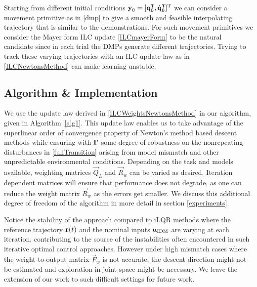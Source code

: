 Starting from different initial conditions $\boldsymbol{\mathrm{y}}_0 = [\boldsymbol{\mathrm{q}}^{\intercal}_0,\dot{\boldsymbol{\mathrm{q}}}^{\intercal}_0]^{\mathrm{T}}$ we can consider a movement primitive as in \eqref{dmp} to give a smooth and feasible interpolating trajectory that is similar to the demonstrations.
For such movement primitives we consider the Mayer form ILC update \eqref{ILCmayerForm} to be the natural candidate since in each trial the DMPs generate different trajectories. Trying to track these varying trajectories with an ILC update law as in \eqref{ILCNewtonsMethod} can make learning unstable.




\subsection{Algorithm \& Implementation}\label{algorithm}

We use the update law derived in \eqref{ILCWeightsNewtonsMethod} in our algorithm, given in Algorithm~\ref{alg1}. This update law enables us to take advantage of the superlinear order of convergence property of Newton's method based descent methods while ensuring with $\boldsymbol{\mathrm{\Gamma}}$ some degree of robustness on the nonrepeating disturbances in \eqref{fullTransition} arising from model mismatch and other unpredictable environmental conditions. Depending on the task and models available, weighting matrices $\vec{Q}_{L}$ and $\vec{R}_{w}$ can be varied as desired. Iteration dependent matrices will ensure that performance does not degrade, as one can reduce the weight matrix $\vec{R}_{w}$ as the errors get smaller. We discuss this additional degree of freedom of the algorithm in more detail in section \ref{experiments}.


Notice the stability of the approach compared to iLQR methods where the reference trajectory $\boldsymbol{\mathrm{r}}(t)$ and the nominal inputs $\boldsymbol{\mathrm{u}}_{\mathrm{IDM}}$ are varying at each iteration, contributing to the source of the instabilities often encountered in such iterative optimal control approaches. However under high mismatch cases where the weight-to-output matrix $\vec{F}_{w}$ is not accurate, the descent direction might not be estimated and exploration in joint space might be necessary. We leave the extension of our work to such difficult settings for future work.

